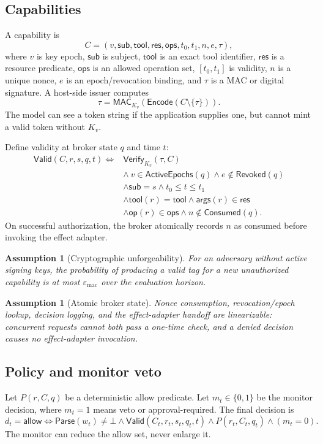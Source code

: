 \documentclass[11pt]{article}
\newtheorem{assumption}[definition]{Assumption}
\newcommand{\1}{\mathbf{1}}
\begin{document}
\subsection{Capabilities}
A capability is
\begin{equation}
 C=(v,\mathsf{sub},\mathsf{tool},\mathsf{res},\mathsf{ops},t_0,t_1,n,e,\tau),
\end{equation}
where $v$ is key epoch, $\mathsf{sub}$ is subject, $\mathsf{tool}$ is an exact tool identifier, $\mathsf{res}$ is a resource predicate, $\mathsf{ops}$ is an allowed operation set, $[t_0,t_1]$ is validity, $n$ is a unique nonce, $e$ is an epoch/revocation binding, and $\tau$ is a MAC or digital signature. A host-side issuer computes
\[
 \tau=\mathsf{MAC}_{K_v}(\mathsf{Encode}(C\setminus\{\tau\})).
\]
The model can see a token string if the application supplies one, but cannot mint a valid token without $K_v$.

Define validity at broker state $q$ and time $t$:
\begin{align}
 \mathsf{Valid}(C,r,s,q,t) \iff{}& \mathsf{Verify}_{K_v}(\tau,C)\\
 &\land\ v\in\mathsf{ActiveEpochs}(q)\land e\notin\mathsf{Revoked}(q)\\
 &\land\mathsf{sub}=s\land t_0\le t\le t_1\\
 &\land\mathsf{tool}(r)=\mathsf{tool}\land\mathsf{args}(r)\in\mathsf{res}\\
 &\land\mathsf{op}(r)\in\mathsf{ops}\land n\notin\mathsf{Consumed}(q).
\end{align}
On successful authorization, the broker atomically records $n$ as consumed before invoking the effect adapter.

\begin{assumption}[Cryptographic unforgeability]
For an adversary without active signing keys, the probability of producing a valid tag for a new unauthorized capability is at most $\varepsilon_{\mathrm{mac}}$ over the evaluation horizon.
\end{assumption}

\begin{assumption}[Atomic broker state]
Nonce consumption, revocation/epoch lookup, decision logging, and the effect-adapter handoff are linearizable: concurrent requests cannot both pass a one-time check, and a denied decision causes no effect-adapter invocation.
\end{assumption}

\subsection{Policy and monitor veto}
Let $P(r,C,q)$ be a deterministic allow predicate. Let $m_t\in\{0,1\}$ be the monitor decision, where $m_t=1$ means veto or approval-required. The final decision is
\begin{equation}
 d_t=\mathsf{allow}\iff \mathsf{Parse}(w_t)\neq\bot \land \mathsf{Valid}(C_t,r_t,s_t,q_t,t)\land P(r_t,C_t,q_t)\land(m_t=0).
\end{equation}
The monitor can reduce the allow set, never enlarge it.
\end{document}
